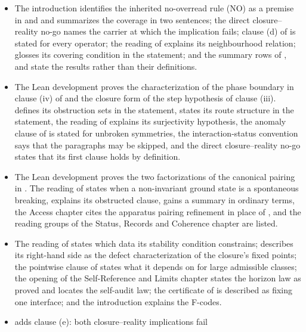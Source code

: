 \begin{itemize}
  footnote to  describes its Lean instance exactly, and the
  Vitali and sheaf-locality instantiations name the readout and the minimal
  domain.
\item The introduction identifies the inherited no-overread rule (NO)
  as a premise in  and  and summarizes the coverage
  in two sentences; the direct
  closure--reality no-go names the carrier at which the implication fails;
  clause (d) of  is stated for every operator; the reading of
   explains its neighbourhood relation;  glosses
  its covering condition in the statement; and the summary rows of
  ,  and  state the results rather than their
  definitions.
\item The Lean development proves the characterization of the phase boundary
  in clause (iv) of  and the closure form of the step hypothesis
  of clause (iii).  defines its obstruction sets in the
  statement,  states its route structure in the statement, the
  reading of  explains its surjectivity hypothesis, the anomaly
  clause of  is stated for unbroken symmetries, the interaction-status
  convention says that the paragraphs may be skipped, and the direct
  closure--reality no-go states that its first clause holds by definition.
\item The Lean development proves the two factorizations of the canonical
  pairing in . The reading of  states when a
  non-invariant ground state is a spontaneous breaking,  explains
  its obstructed clause,  gains a summary in ordinary terms, the
  Access chapter cites the apparatus pairing refinement in place of
  , and the reading groups
  of the Status, Records and Coherence chapter are listed.
\item The reading of  states which data its stability condition
  constrains;  describes its right-hand side as the defect
  characterization of the closure's fixed points; the pointwise clause of
   states what it depends on for large admissible classes; the
  opening of the Self-Reference and Limits chapter states the horizon law as
  proved and locates the self-audit law; the certificate of  is
  described as fixing one interface; and the introduction explains the
  F-codes.
\item {} adds clause (e): both closure--reality implications fail

\end{itemize}
